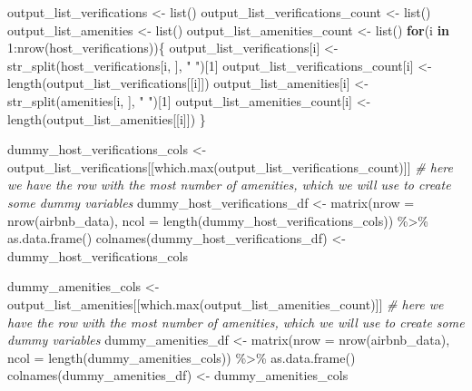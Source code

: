 \documentclass[
]{article}
\newenvironment{Shaded}{\begin{snugshade}}{\end{snugshade}}
\newcommand{\AttributeTok}[1]{\textcolor[rgb]{0.77,0.63,0.00}{#1}}
\newcommand{\CommentTok}[1]{\textcolor[rgb]{0.56,0.35,0.01}{\textit{#1}}}
\newcommand{\ControlFlowTok}[1]{\textcolor[rgb]{0.13,0.29,0.53}{\textbf{#1}}}
\newcommand{\DecValTok}[1]{\textcolor[rgb]{0.00,0.00,0.81}{#1}}
\newcommand{\FunctionTok}[1]{\textcolor[rgb]{0.00,0.00,0.00}{#1}}
\newcommand{\NormalTok}[1]{#1}
\newcommand{\OtherTok}[1]{\textcolor[rgb]{0.56,0.35,0.01}{#1}}
\newcommand{\SpecialCharTok}[1]{\textcolor[rgb]{0.00,0.00,0.00}{#1}}
\newcommand{\StringTok}[1]{\textcolor[rgb]{0.31,0.60,0.02}{#1}}
\begin{document}
\begin{Shaded}
\begin{Highlighting}[]
\NormalTok{output\_list\_verifications }\OtherTok{\textless{}{-}} \FunctionTok{list}\NormalTok{()}
\NormalTok{output\_list\_verifications\_count }\OtherTok{\textless{}{-}} \FunctionTok{list}\NormalTok{()}
\NormalTok{output\_list\_amenities }\OtherTok{\textless{}{-}} \FunctionTok{list}\NormalTok{()}
\NormalTok{output\_list\_amenities\_count }\OtherTok{\textless{}{-}} \FunctionTok{list}\NormalTok{()}
\ControlFlowTok{for}\NormalTok{(i }\ControlFlowTok{in} \DecValTok{1}\SpecialCharTok{:}\FunctionTok{nrow}\NormalTok{(host\_verifications))\{}
\NormalTok{        output\_list\_verifications[i] }\OtherTok{\textless{}{-}} \FunctionTok{str\_split}\NormalTok{(host\_verifications[i, ], }\StringTok{" "}\NormalTok{)[}\DecValTok{1}\NormalTok{]}
\NormalTok{        output\_list\_verifications\_count[i] }\OtherTok{\textless{}{-}} \FunctionTok{length}\NormalTok{(output\_list\_verifications[[i]])}
\NormalTok{        output\_list\_amenities[i] }\OtherTok{\textless{}{-}} \FunctionTok{str\_split}\NormalTok{(amenities[i, ], }\StringTok{"  "}\NormalTok{)[}\DecValTok{1}\NormalTok{]}
\NormalTok{        output\_list\_amenities\_count[i] }\OtherTok{\textless{}{-}} \FunctionTok{length}\NormalTok{(output\_list\_amenities[[i]])}
\NormalTok{\}}

\NormalTok{dummy\_host\_verifications\_cols }\OtherTok{\textless{}{-}}\NormalTok{ output\_list\_verifications[[}\FunctionTok{which.max}\NormalTok{(output\_list\_verifications\_count)]] }\CommentTok{\# here we have the row with the most number of amenities, which we will use to create some dummy variables}
\NormalTok{dummy\_host\_verifications\_df }\OtherTok{\textless{}{-}} \FunctionTok{matrix}\NormalTok{(}\AttributeTok{nrow =} \FunctionTok{nrow}\NormalTok{(airbnb\_data), }\AttributeTok{ncol =} \FunctionTok{length}\NormalTok{(dummy\_host\_verifications\_cols)) }\SpecialCharTok{\%\textgreater{}\%} \FunctionTok{as.data.frame}\NormalTok{()}
\FunctionTok{colnames}\NormalTok{(dummy\_host\_verifications\_df) }\OtherTok{\textless{}{-}}\NormalTok{ dummy\_host\_verifications\_cols}

\NormalTok{dummy\_amenities\_cols }\OtherTok{\textless{}{-}}\NormalTok{ output\_list\_amenities[[}\FunctionTok{which.max}\NormalTok{(output\_list\_amenities\_count)]] }\CommentTok{\# here we have the row with the most number of amenities, which we will use to create some dummy variables}
\NormalTok{dummy\_amenities\_df }\OtherTok{\textless{}{-}} \FunctionTok{matrix}\NormalTok{(}\AttributeTok{nrow =} \FunctionTok{nrow}\NormalTok{(airbnb\_data), }\AttributeTok{ncol =} \FunctionTok{length}\NormalTok{(dummy\_amenities\_cols)) }\SpecialCharTok{\%\textgreater{}\%} \FunctionTok{as.data.frame}\NormalTok{()}
\FunctionTok{colnames}\NormalTok{(dummy\_amenities\_df) }\OtherTok{\textless{}{-}}\NormalTok{ dummy\_amenities\_cols}


\end{Highlighting}
\end{Shaded}
\end{document}
